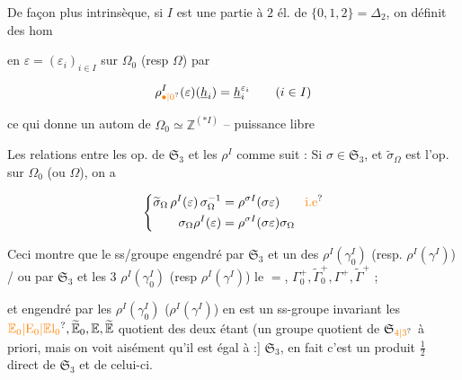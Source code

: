  De façon plus intrinsèque, si $I$ est une partie à $2$ él.  de $\{0,1,2\}=\Delta_2$, on définit des hom


en  $\varepsilon=(\varepsilon_i)_{i\in I}$ sur $\Omega_0$ (resp $\Omega$) par 

\[
 \rho^I_{\unsure{\bullet|0}}(\varepsilon)(\underline h_i)=\underline h_i^{\varepsilon_i}\qquad(i\in I)
\]

 ce qui donne un autom de $\Omega_0\simeq\mathbb Z^{(*I)}$ -- puissance libre

Les relations entre les op. de $\mathfrak S_3$ et les $\rho^I$
 comme suit : Si $\sigma\in\mathfrak S_3$, et $\widetilde\sigma_\Omega$ est l'op. sur $\Omega_0$ (ou $\Omega$), on a

\[
 \left\{\begin{aligned}
 \widetilde\sigma_\Omega\,\rho^I(\varepsilon)\,\sigma_\Omega^{-1}
 &=\rho^{\sigma I}(\sigma\varepsilon)\qquad\text{\unsure{i.e}}\\
 \sigma_\Omega\rho^I(\varepsilon)&=\rho^{\sigma I}(\sigma\varepsilon)\sigma_\Omega
 \end{aligned}\right.
\]

Ceci montre que le ss/groupe  engendré par $\mathfrak S_3$ et un des $\rho^I(\gamma_0^I)$ (resp. $\rho^I(\gamma^I)$) /  ou par $\mathfrak S_3$ et  les $3$ $\rho^I(\gamma_0^I)$ (resp $\rho^I(\gamma^I)$)  le $=$,  $\Gamma_0^+,\widetilde\Gamma_0^+,\Gamma^+,\widetilde\Gamma^+$ ;


et   engendré par les $\rho^I(\gamma_0^I)$ ($\rho^I(\gamma^I)$) en est un ss-groupe invariant  les $\unsure{\mathbb E_0|\mathrm E_0|\mathbb E\mathrm l_0},\widetilde{\mathbb E}_0,\mathbb E,\widetilde{\mathbb E}$  quotient des deux étant  (un groupe quotient de $\mathfrak S_{\unsure{4|3}}$ à priori, mais on voit aisément qu'il est égal à :] $\mathfrak S_3$, en fait c'est un produit $\tfrac12$ direct de $\mathfrak S_3$ et de celui-ci.

